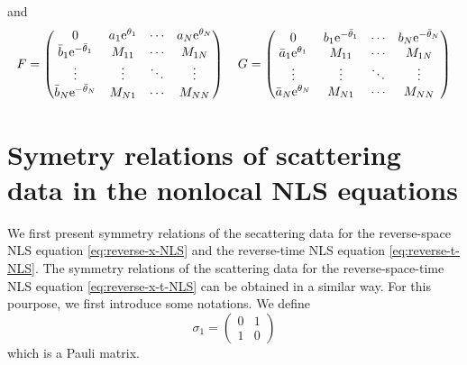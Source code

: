 and 
\begin{equation}
    F = \begin{pmatrix}
        0 & a_{1} \mathrm{e}^{\theta_{1}} & \cdots & a_{N} \mathrm{e}^{\theta_{N}} \\
        \bar{b}_{1} \mathrm{e}^{-\bar{\theta}_{1}} & M_{11} & \cdots & M_{1N} \\
        \vdots & \vdots & \ddots & \vdots \\
        \bar{b}_{N} \mathrm{e}^{-\bar{\theta}_{N}} & M_{N1} & \cdots & M_{NN}
    \end{pmatrix} 
    \quad 
    G = \begin{pmatrix}
        0 & b_{1} \mathrm{e}^{-\bar{\theta}_{1}} & \cdots & b_{N} \mathrm{e}^{-\bar{\theta}_{N}} \\
        \bar{a}_{1} \mathrm{e}^{\theta_{1}} & M_{11} & \cdots & M_{1N} \\
        \vdots & \vdots & \ddots & \vdots \\
        \bar{a}_{N} \mathrm{e}^{\theta_{N}} & M_{N1} & \cdots & M_{NN}
    \end{pmatrix}
\end{equation}
\section{Symetry relations of scattering data in the nonlocal NLS equations}
We first present symmetry relations of the secattering data for the reverse-space NLS equation \eqref{eq:reverse-x-NLS} and the reverse-time NLS equation \eqref{eq:reverse-t-NLS}. The symmetry relations of the scattering data for the reverse-space-time NLS equation \eqref{eq:reverse-x-t-NLS} can be obtained in a similar way. For this pourpose, we first introduce some notations. We define
\begin{equation}
    \sigma_{1} = \begin{pmatrix}
        0 & 1 \\
        1 & 0
    \end{pmatrix}
\end{equation}
which is a Pauli matrix.
